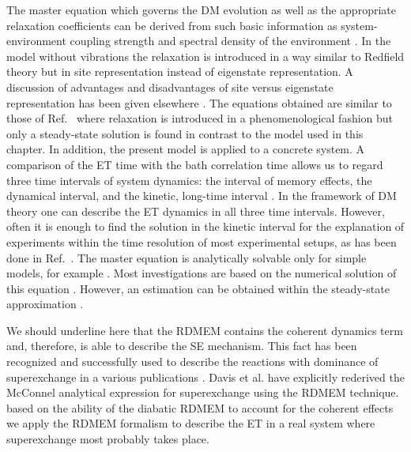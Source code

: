 \documentclass[12pt,twoside,a4paper]{report}
\begin{document}
The master equation which governs the DM evolution as well as the 
appropriate relaxation coefficients can be derived from such basic 
information as system-environment coupling strength and spectral density of 
the environment \cite{redf55,blum96,f3,may92,m11-n1,k5}. In the model 
without vibrations the relaxation is introduced in a way similar to Redfield 
theory but in site representation instead of eigenstate representation. A 
discussion of advantages and disadvantages of site versus eigenstate 
representation has been given elsewhere \cite{dav98a}. The equations 
obtained are similar to those of Ref.\ \cite{d2} where relaxation is 
introduced in a phenomenological fashion but only a steady-state solution is 
found in contrast to the model used in this chapter. 
In addition, the present model is 
applied to a concrete system. A comparison of the ET time with the bath 
correlation time allows us to %
regard three time intervals of system dynamics: the interval of memory 
effects, the dynamical interval, and the kinetic, long-time interval \cite 
{rein82}. In the framework of DM theory one can describe the ET dynamics in 
all three time intervals. However, often it is enough to find the solution 
in the kinetic interval for the explanation of experiments within the time 
resolution of most experimental setups, as has been done in Ref.~\cite{d2,w4}. 
The master equation is analytically solvable only for simple models, for 
example \cite{l4,k9}. Most investigations are based on the numerical 
solution of this equation \cite{skou95,may92,kueh94,p3,m11-n1,j3}. However, an 
estimation can be obtained within the steady-state approximation \cite{d2,n2}. 

We should underline here that the RDMEM 
contains
the coherent dynamics term and, therefore, is able to describe the SE
mechanism.  This fact has been recognized and successfully used to
describe the reactions with dominance of superexchange 
in a various publications
\cite{d2,schr98b,p3}.  
Davis et al. \cite{d2} have
explicitly rederived the McConnel analytical expression for superexchange using
the RDMEM technique.  
based on the ability of the diabatic RDMEM
to account for the coherent effects
we apply the RDMEM formalism to
describe the ET in a real system where superexchange most probably takes place.
\end{document}
